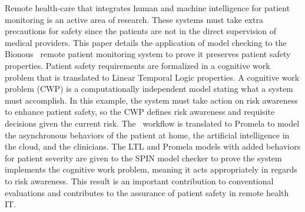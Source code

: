 Remote health-care that integrates human and machine intelligence for patient monitoring is an active area of research. These systems must take extra precautions for safety since the patients are not in the direct supervision of medical providers. This paper details the application of model checking to the Bionous \phware\ remote patient monitoring system to prove it preserves patient safety properties. Patient safety requirements are formalized in a cognitive work problem that is translated to Linear Temporal Logic properties. A cognitive work problem (CWP) is a computationally independent model stating what a system must accomplish. In this example, the system must take action on risk awareness to enhance patient safety, so the CWP defines risk awareness and requisite decisions given the current risk. The \phware\ workflow is translated to Promela to model the asynchronous behaviors of the patient at home, the artificial intelligence in the cloud, and the clinicians. The LTL and Promela models with added behaviors for patient severity are given to the SPIN model checker to prove the system implements the cognitive work problem, meaning it acts appropriately in regards to risk awareness. This result is an important contribution to conventional evaluations and contributes to the assurance of patient safety in remote health IT.